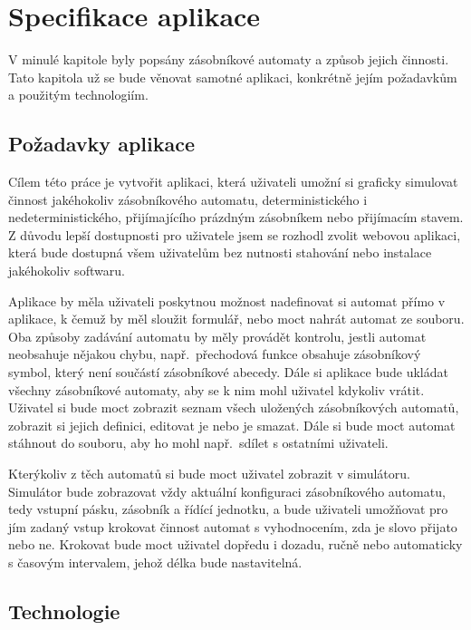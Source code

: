 \chapter{Specifikace aplikace}\label{chap:AppSpecifications}

V minulé kapitole byly popsány zásobníkové automaty a způsob jejich činnosti. Tato kapitola už se bude věnovat samotné aplikaci, konkrétně jejím požadavkům a použitým technologiím.

\section{Požadavky aplikace}

Cílem této práce je vytvořit aplikaci, která uživateli umožní si graficky simulovat činnost jakéhokoliv zásobníkového automatu, deterministického i nedeterministického, přijímajícího prázdným zásobníkem nebo přijímacím stavem. Z důvodu lepší dostupnosti pro uživatele jsem se rozhodl zvolit webovou aplikaci, která bude dostupná všem uživatelům bez nutnosti stahování nebo instalace jakéhokoliv softwaru. 

Aplikace by měla uživateli poskytnou možnost nadefinovat si automat přímo v aplikace, k čemuž by měl sloužit formulář, nebo moct nahrát automat ze souboru. Oba způsoby zadávání automatu by měly provádět kontrolu, jestli automat neobsahuje nějakou chybu, např.~přechodová funkce obsahuje zásobníkový symbol, který není součástí zásobníkové abecedy. 
Dále si aplikace bude ukládat všechny zásobníkové automaty, aby se k nim mohl uživatel kdykoliv vrátit. Uživatel si bude moct zobrazit seznam všech uložených zásobníkových automatů, zobrazit si jejich definici, editovat je nebo je smazat. Dále si bude moct automat stáhnout do souboru, aby ho mohl např.~sdílet s ostatními uživateli. 

Kterýkoliv z těch automatů si bude moct uživatel zobrazit v simulátoru. Simulátor bude zobrazovat vždy aktuální konfiguraci zásobníkového automatu, tedy vstupní pásku, zásobník a řídící jednotku, a bude uživateli umožňovat pro jím zadaný vstup krokovat činnost automat s vyhodnocením, zda je slovo přijato nebo ne. Krokovat bude moct uživatel dopředu i dozadu, ručně nebo automaticky s časovým intervalem, jehož délka bude nastavitelná.

\section{Technologie}

